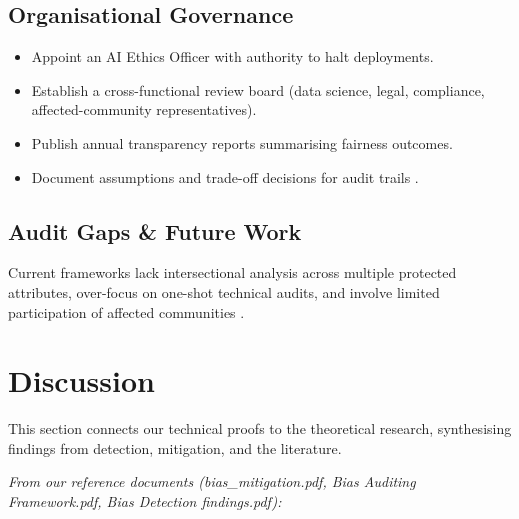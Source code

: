 \documentclass[conference]{IEEEtran}
\begin{document}
\subsection{Organisational Governance}

\begin{itemize}
\item Appoint an AI Ethics Officer with authority to halt deployments.
\item Establish a cross-functional review board (data science, legal,
  compliance, affected-community representatives).
\item Publish annual transparency reports summarising fairness outcomes.
\item Document assumptions and trade-off decisions for audit trails
  \cite{murikah2024,gonzalez2023}.
\end{itemize}

\subsection{Audit Gaps \& Future Work}

Current frameworks lack intersectional analysis across multiple protected attributes, over-focus on one-shot technical audits, and involve limited participation of affected communities \cite{murikah2024,funda2025}.

\section{Discussion}
\label{sec:discussion}

This section connects our technical proofs to the theoretical research, synthesising findings from detection, mitigation, and the literature.

\textit{From our reference documents (bias\_mitigation.pdf, Bias Auditing Framework.pdf, Bias Detection findings.pdf):}
\end{document}
